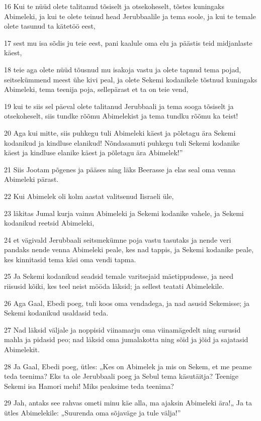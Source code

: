 \par 16 Kui te nüüd olete talitanud tõsiselt ja otsekoheselt, tõstes kuningaks Abimeleki, ja kui te olete teinud head Jerubbaalile ja tema soole, ja kui te temale olete tasunud ta kätetöö eest,
\par 17 sest mu isa sõdis ju teie eest, pani kaalule oma elu ja päästis teid midjanlaste käest,
\par 18 teie aga olete nüüd tõusnud mu isakoja vastu ja olete tapnud tema pojad, seitsekümmend meest ühe kivi peal, ja olete Sekemi kodanikele tõstnud kuningaks Abimeleki, tema teenija poja, sellepärast et ta on teie vend,
\par 19 kui te siis sel päeval olete talitanud Jerubbaali ja tema sooga tõsiselt ja otsekoheselt, siis tundke rõõmu Abimelekist ja tema tundku rõõmu ka teist!
\par 20 Aga kui mitte, siis puhkegu tuli Abimeleki käest ja põletagu ära Sekemi kodanikud ja kindluse elanikud! Nõndasamuti puhkegu tuli Sekemi kodanike käest ja kindluse elanike käest ja põletagu ära Abimelek!”
\par 21 Siis Jootam põgenes ja pääses ning läks Beerasse ja elas seal oma venna Abimeleki pärast.
\par 22 Kui Abimelek oli kolm aastat valitsenud Iisraeli üle,
\par 23 läkitas Jumal kurja vaimu Abimeleki ja Sekemi kodanike vahele, ja Sekemi kodanikud reetsid Abimeleki,
\par 24 et vägivald Jerubbaali seitsmekümne poja vastu tasutaks ja nende veri pandaks nende venna Abimeleki peale, kes nad tappis, ja Sekemi kodanike peale, kes kinnitasid tema käsi oma vendi tapma.
\par 25 Ja Sekemi kodanikud seadsid temale varitsejaid mäetippudesse, ja need riisusid kõiki, kes teel neist mööda läksid; ja sellest teatati Abimelekile.
\par 26 Aga Gaal, Ebedi poeg, tuli koos oma vendadega, ja nad asusid Sekemisse; ja Sekemi kodanikud usaldasid teda.
\par 27 Nad läksid väljale ja noppisid viinamarju oma viinamägedelt ning surusid mahla ja pidasid peo; nad läksid oma jumalakotta ning sõid ja jõid ja sajatasid Abimelekit.
\par 28 Ja Gaal, Ebedi poeg, ütles: „Kes on Abimelek ja mis on Sekem, et me peame teda teenima? Eks ta ole Jerubbaali poeg ja Sebul tema käsutäitja? Teenige Sekemi isa Hamori mehi! Miks peaksime teda teenima?
\par 29 Jah, antaks see rahvas ometi minu käe alla, ma ajaksin Abimeleki ära!„ Ja ta ütles Abimelekile: „Suurenda oma sõjaväge ja tule välja!”
